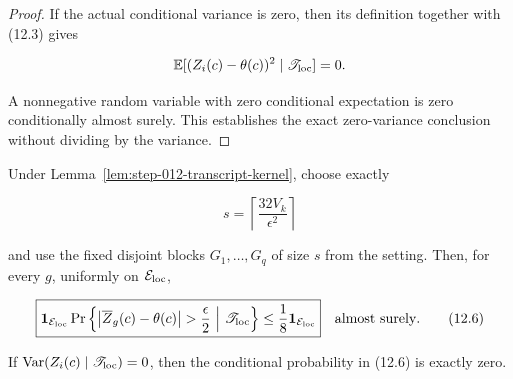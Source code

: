 \begin{proof}
If the actual conditional variance is zero, then its definition together
with (12.3) gives

\[
\mathbb E[(Z_i(c)-\theta(c))^2\mid\mathscr T_{\rm loc}]=0.
\]

A nonnegative random variable with zero conditional expectation is zero
conditionally almost surely. This establishes the exact
zero-variance conclusion without dividing by the variance.
\end{proof}

\begin{proposition}\label{prop:step-012-one-block}
Under Lemma~\ref{lem:step-012-transcript-kernel}, choose exactly

\[
s=\left\lceil\frac{32V_k}{\epsilon^2}\right\rceil
\]

and use the fixed disjoint blocks \(G_1,\ldots,G_q\) of size \(s\) from the
setting. Then, for every \(g\), uniformly on
\(\mathcal E_{\rm loc}\),

\[
\boxed{
\mathbf1_{\mathcal E_{\rm loc}}
\Pr\left\{
\left|\overline Z_g(c)-\theta(c)\right|>\frac{\epsilon}{2}
\ \middle|\ \mathscr T_{\rm loc}
\right\}
\leq\frac18\mathbf1_{\mathcal E_{\rm loc}}
}
\quad\text{almost surely}.
\tag{12.6}
\]

If
\(\operatorname{Var}(Z_i(c)\mid\mathscr T_{\rm loc})=0\), then the
conditional probability in (12.6) is exactly zero.
\end{proposition}

